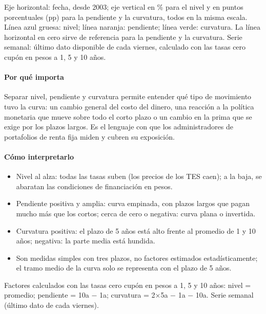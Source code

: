 \begin{leer}
Eje horizontal: fecha, desde 2003; eje vertical en \% para el nivel y en puntos porcentuales (pp) para la pendiente y la curvatura, todos en la misma escala. Línea azul gruesa: nivel; línea naranja: pendiente; línea verde: curvatura. La línea horizontal en cero sirve de referencia para la pendiente y la curvatura. Serie semanal: último dato disponible de cada viernes, calculado con las tasas cero cupón en pesos a 1, 5 y 10 años.
\end{leer}

\paragraph{Por qué importa}
Separar nivel, pendiente y curvatura permite entender qué tipo de movimiento tuvo la curva: un cambio general del costo del dinero, una reacción a la política monetaria que mueve sobre todo el corto plazo o un cambio en la prima que se exige por los plazos largos. Es el lenguaje con que los administradores de portafolios de renta fija miden y cubren su exposición.

\paragraph{Cómo interpretarlo}
\begin{itemize}
\item Nivel al alza: todas las tasas suben (los precios de los TES caen); a la baja, se abaratan las condiciones de financiación en pesos.
\item Pendiente positiva y amplia: curva empinada, con plazos largos que pagan mucho más que los cortos; cerca de cero o negativa: curva plana o invertida.
\item Curvatura positiva: el plazo de 5 años está alto frente al promedio de 1 y 10 años; negativa: la parte media está hundida.
\item Son medidas simples con tres plazos, no factores estimados estadísticamente; el tramo medio de la curva solo se representa con el plazo de 5 años.
\end{itemize}
\begin{formulas}[Fórmulas]
\end{formulas}
\begin{metodo}[Metodología]
Factores calculados con las tasas cero cupón en pesos a 1, 5 y 10 años: nivel = promedio; pendiente = 10a − 1a; curvatura = 2$\times$5a − 1a − 10a. Serie semanal (último dato de cada viernes).
\par{}
\end{metodo}

